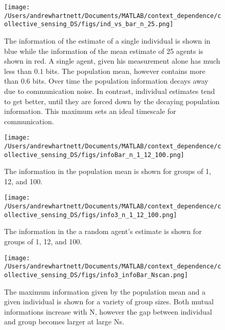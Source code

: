 \documentclass{article}
\begin{document}
\begin{figure}[H]
\centering
\texttt{[image: /Users/andrewhartnett/Documents/MATLAB/context\_dependence/collective\_sensing\_DS/figs/ind\_vs\_bar\_n\_25.png]}
\caption{\label{fig:fig1} The information of the estimate of a single individual is shown in blue while the information of the mean estimate of 25 agents is shown in red.  A single agent, given his measurement alone has much less than $0.1$ bits.  The population mean, however contains more than $0.6$ bits.  Over time the population information decays away due to communication noise.  In contrast, individual estimates tend to get better, until they are forced down by the decaying population information.  This maximum sets an ideal timescale for communication.}
\end{figure}

\begin{figure}[H]
\centering
\texttt{[image: /Users/andrewhartnett/Documents/MATLAB/context\_dependence/collective\_sensing\_DS/figs/infoBar\_n\_1\_12\_100.png]}
\caption{\label{fig:fig2} The information in the population mean is shown for groups of 1, 12, and 100.}
\end{figure}

\begin{figure}[H]
\centering
\texttt{[image: /Users/andrewhartnett/Documents/MATLAB/context\_dependence/collective\_sensing\_DS/figs/info3\_n\_1\_12\_100.png]}
\caption{\label{fig:fig3} The information in the a random agent's estimate is shown for groups of 1, 12, and 100.}
\end{figure}

\begin{figure}[H]
\centering
\texttt{[image: /Users/andrewhartnett/Documents/MATLAB/context\_dependence/collective\_sensing\_DS/figs/info3\_infoBar\_Nscan.png]}
\caption{\label{fig:fig4} The maximum information given by the population mean and a given individual is shown for a variety of group sizes.  Both mutual informations increase with N, however the gap between individual and group becomes larger at large Ns.}
\end{figure}
\end{document}
